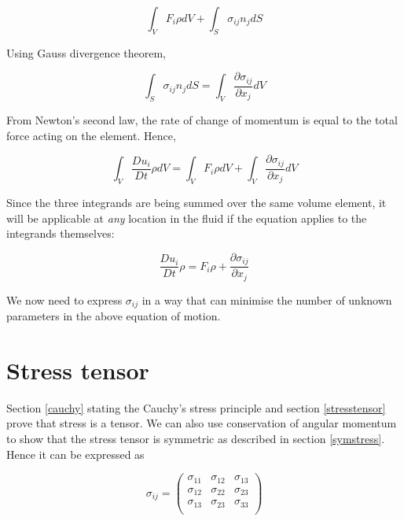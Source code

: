 $$ \int_{V}{F_i\rho dV} + \int_{S}{\sigma_{ij}n_jdS} $$

Using Gauss divergence theorem, 

\begin{equation}
\int_{S}{\sigma_{ij}n_jdS} = \int_{V}{\frac{\partial \sigma_{ij}}{\partial x_j}dV}
\end{equation} 

From Newton's second law, the rate of change of momentum is equal to the total force acting on the element. Hence,

\begin{equation}
\int_{V}{\frac{Du_i}{Dt}\rho dV}  =  \int_{V}{F_i\rho dV} + \int_{V}{\frac{\partial \sigma_{ij}}{\partial x_j}dV}
\end{equation} 

Since the three integrands are being summed over the same volume element, it will be applicable at {\em any} location in the fluid if the equation applies to the integrands themselves:

\begin{equation}
\label{eqmotion}
\boxed{\frac{Du_i}{Dt}\rho =  F_i\rho + \frac{\partial \sigma_{ij}}{\partial x_j}}
\end{equation} 

We now need to express $\sigma_{ij}$ in a way that can minimise the number of unknown parameters in the above equation of motion.

\section{Stress tensor}

Section \ref{cauchy} stating the Cauchy's stress principle and section \ref{stresstensor} prove that stress is a tensor. We can also use conservation of angular momentum to show that the stress tensor is symmetric as described in section \ref{symstress}. Hence it can be expressed as 

\begin{equation}
\sigma_{ij} = \left(
\begin{array}{lll}
\sigma_{11} & \sigma_{12} & \sigma_{13} \\ 
\sigma_{12} & \sigma_{22} & \sigma_{23} \\ 
\sigma_{13} & \sigma_{23} & \sigma_{33} \\ 
\end{array}
\right)
\end{equation} 

